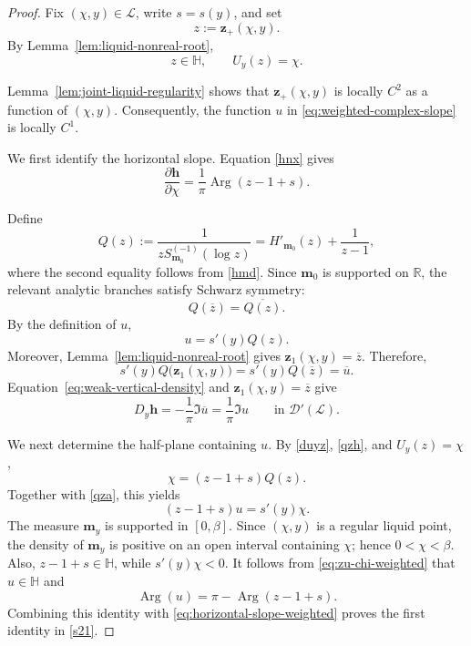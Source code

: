 \documentclass[11pt]{amsart}
\theoremstyle{plain}
\numberwithin{equation}{section}
\numberwithin{theorem}{section}
\numberwithin{figure}{section}
\begin{document}
\begin{proof}
Fix $(\chi,y)\in\mathcal L$, write $s=s(y)$, and set
\[
    z:=\mathbf z_+(\chi,y).
\]
By Lemma~\ref{lem:liquid-nonreal-root},
\[
    z\in\mathbb H,
    \qquad
    U_y(z)=\chi.
\]

Lemma~\ref{lem:joint-liquid-regularity} shows that
$\mathbf z_+(\chi,y)$ is locally $C^2$ as a function of
$(\chi,y)$. Consequently, the function $u$ in
\eqref{eq:weighted-complex-slope} is locally $C^1$.


We first identify the horizontal slope. Equation \eqref{hnx} gives
\begin{equation}
    \frac{\partial\mathbf h}{\partial\chi}
    =
    \frac{1}{\pi}
    \operatorname{Arg}(z-1+s).
    \label{eq:horizontal-slope-weighted}
\end{equation}

Define
\begin{equation}
    Q(z)
    :=
    \frac{1}{
        zS_{\mathbf m_0}^{(-1)}(\log z)
    }
    =
    H'_{\mathbf m_0}(z)+\frac{1}{z-1},
    \label{qzh}
\end{equation}
where the second equality follows from \eqref{hmd}. Since
$\mathbf m_0$ is supported on $\mathbb R$, the relevant analytic
branches satisfy Schwarz symmetry:
\[
    Q(\overline z)=\overline{Q(z)}.
\]
By the definition of $u$,
\begin{equation}
    u=s'(y)Q(z).
    \label{qza}
\end{equation}
Moreover, Lemma~\ref{lem:liquid-nonreal-root} gives
$\mathbf z_1(\chi,y)=\overline z$. Therefore,
\[
    s'(y)Q\bigl(\mathbf z_1(\chi,y)\bigr)
    =
    s'(y)Q(\overline z)
    =
    \overline u.
\]
Equation~\eqref{eq:weak-vertical-density} and
$\mathbf z_1(\chi,y)=\overline z$ give
\begin{equation}
    D_y\mathbf h
    =
    -\frac{1}{\pi}\Im\overline u
    =
    \frac{1}{\pi}\Im u
    \qquad\text{in }\mathcal D'(\mathcal L).
    \label{eq:weak-vertical-slope}
\end{equation}

We next determine the half-plane containing $u$. By
\eqref{duyz}, \eqref{qzh}, and $U_y(z)=\chi$,
\[
    \chi=(z-1+s)Q(z).
\]
Together with \eqref{qza}, this yields
\begin{equation}
    (z-1+s)u=s'(y)\chi.
    \label{eq:zu-chi-weighted}
\end{equation}
The measure $\mathbf m_y$ is supported in $[0,\beta]$. Since
$(\chi,y)$ is a regular liquid point, the density of
$\mathbf m_y$ is positive on an open interval containing $\chi$;
hence $0<\chi<\beta$. Also, $z-1+s\in\mathbb H$, while
$s'(y)\chi<0$. It follows from
\eqref{eq:zu-chi-weighted} that $u\in\mathbb H$ and
\[
    \operatorname{Arg}(u)
    =
    \pi-\operatorname{Arg}(z-1+s).
\]
Combining this identity with
\eqref{eq:horizontal-slope-weighted} proves the first identity in
\eqref{s21}.


\end{proof}
\end{document}
